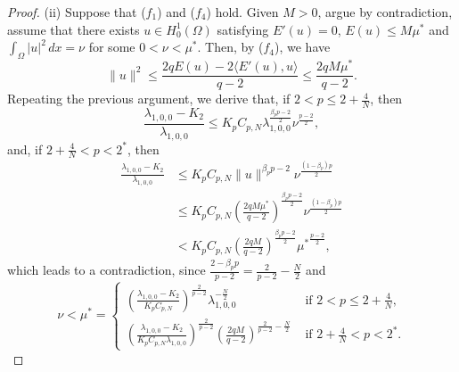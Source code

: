 \documentclass[10pt,a4paper]{amsart}
\newcommand{\norm}[1]{\lVert#1\rVert}
\begin{document}
\begin{proof}
    (ii) Suppose that ($f_1$) and ($f_4$) hold. Given $M>0$, argue by contradiction, assume that there exists $u \in H_0^1(\Omega)$ satisfying $E'(u) = 0$, $E(u)\leq M\mu^*$ and $\int_{\Omega}|u|^2\,dx=\nu$ for some $0<\nu<\mu^*$. Then, by ($f_4$), we have
    $$
    \norm{u}^2 \leq \frac{2qE(u)-2\langle E'(u),u\rangle}{q-2}\leq \frac{2qM\mu^*}{q-2}.
    $$
    Repeating the previous argument, we derive that, if $2<p\leq2+\frac{4}{N}$, then
    $$
    \frac{\lambda_{1,0,0}-K_2}{\lambda_{1,0,0}}\leq K_{p} C_{p,N} \lambda_{1,0,0}^\frac{{\beta_{p}{p}-2}}{2}\nu^\frac{p-2}{2},
    $$
    and, if $2+\frac{4}{N}<p<2^*$, then
    $$
    \begin{aligned}
        \frac{\lambda_{1,0,0}-K_2}{\lambda_{1,0,0}}&\leq K_{p} C_{p,N}\norm{u}^{\beta_{p}{p}-2}\nu^\frac{(1-\beta_{p}){p}}{2}\\
        &\leq K_{p} C_{p,N}\left(\frac{2qM\mu^*}{q-2}\right)^\frac{{\beta_{p}{p}-2}}{2}{\nu}^\frac{(1-\beta_p) p}{2}\\
        &<K_{p} C_{p,N}\left(\frac{2qM}{q-2}\right)^\frac{{\beta_{p}{p}-2}}{2}{\mu^*}^\frac{p-2}{2},
    \end{aligned}
    $$
    which leads to a contradiction, since $\frac{2-\beta_pp}{p-2}=\frac{2}{p-2}-\frac{N}{2}$ and
 $$\nu < \mu^*=
\begin{cases}
    \left(\frac{\lambda_{1,0,0}-K_2}{K_pC_{p,N}}\right)^{\frac{2}{p-2}}\lambda_{1,0,0}^{-\frac{N}{2}}  &\text{ if } 2<p\leq 2+\frac{4}{N},\\
    \left(\frac{\lambda_{1,0,0}-K_2}{K_pC_{p,N}\lambda_{1,0,0}}\right)^{\frac{2}{p-2}}\left(\frac{2qM}{q-2}\right)^{\frac{2}{p-2}-\frac{N}{2}} &\text{ if }  2+\frac{4}{N}<p<2^*.
\end{cases}$$
\end{proof}
\end{document}
